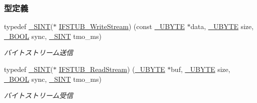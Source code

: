 \subsubsection*{型定義}
\begin{DoxyCompactItemize}
\item 
typedef \hyperlink{stddef_8h_aefd1068e35d26c0e7d7079ddf2579174_aefd1068e35d26c0e7d7079ddf2579174}{\+\_\+\+S\+I\+N\+T}($\ast$ \hyperlink{ifstub_8h_aa9d065d1024ada655c29137cc02240a3_aa9d065d1024ada655c29137cc02240a3}{I\+F\+S\+T\+U\+B\+\_\+\+Write\+Stream}) (const \hyperlink{stddef_8h_aac464b47452ce9406f88ef194e2becc1_aac464b47452ce9406f88ef194e2becc1}{\+\_\+\+U\+B\+Y\+T\+E} $\ast$data, \hyperlink{stddef_8h_aac464b47452ce9406f88ef194e2becc1_aac464b47452ce9406f88ef194e2becc1}{\+\_\+\+U\+B\+Y\+T\+E} size, \hyperlink{stddef_8h_afbf708854fe02af8475a9ba02f3196cb_afbf708854fe02af8475a9ba02f3196cb}{\+\_\+\+B\+O\+O\+L} sync, \hyperlink{stddef_8h_aefd1068e35d26c0e7d7079ddf2579174_aefd1068e35d26c0e7d7079ddf2579174}{\+\_\+\+S\+I\+N\+T} tmo\+\_\+ms)
\begin{DoxyCompactList}\small\item\em バイトストリーム送信 \end{DoxyCompactList}\item 
typedef \hyperlink{stddef_8h_aefd1068e35d26c0e7d7079ddf2579174_aefd1068e35d26c0e7d7079ddf2579174}{\+\_\+\+S\+I\+N\+T}($\ast$ \hyperlink{ifstub_8h_a620340ac755d877dfbe38fee8263e6fe_a620340ac755d877dfbe38fee8263e6fe}{I\+F\+S\+T\+U\+B\+\_\+\+Read\+Stream}) (\hyperlink{stddef_8h_aac464b47452ce9406f88ef194e2becc1_aac464b47452ce9406f88ef194e2becc1}{\+\_\+\+U\+B\+Y\+T\+E} $\ast$buf, \hyperlink{stddef_8h_aac464b47452ce9406f88ef194e2becc1_aac464b47452ce9406f88ef194e2becc1}{\+\_\+\+U\+B\+Y\+T\+E} size, \hyperlink{stddef_8h_afbf708854fe02af8475a9ba02f3196cb_afbf708854fe02af8475a9ba02f3196cb}{\+\_\+\+B\+O\+O\+L} sync, \hyperlink{stddef_8h_aefd1068e35d26c0e7d7079ddf2579174_aefd1068e35d26c0e7d7079ddf2579174}{\+\_\+\+S\+I\+N\+T} tmo\+\_\+ms)
\begin{DoxyCompactList}\small\item\em バイトストリーム受信 \end{DoxyCompactList}\end{DoxyCompactItemize}
